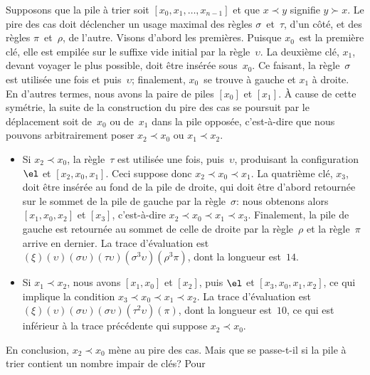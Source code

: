 Supposons que la pile à trier soit \([x_0, x_1, \dots, x_{n-1}]\) et
que \(x \prec y\) signifie \(y \succ x\). Le pire des cas doit
déclencher un usage maximal des règles \(\sigma\)~et~\(\tau\), d'un
côté, et des règles \(\pi\)~et~\(\rho\), de l'autre. Visons d'abord
les premières. Puisque \(x_0\)~est la première clé, elle est empilée
sur le suffixe vide initial par la règle~\(\upsilon\). La deuxième
clé, \(x_1\), devant voyager le plus possible, doit être insérée
sous~\(x_0\). Ce faisant, la règle~\(\sigma\) est utilisée une fois et
puis~\(\upsilon\); finalement, \(x_0\)~se trouve à gauche et \(x_1\) à
droite. En d'autres termes, nous avons la paire de piles \([x_0]\) et
\([x_1]\). À cause de cette symétrie, la suite de la construction du
pire des cas se poursuit par le déplacement soit de~\(x_0\) ou
de~\(x_1\) dans la pile opposée, c'est-à-dire que nous pouvons
arbitrairement poser \(x_2 \prec x_0\) ou \(x_1 \prec x_2\).
\begin{itemize}

\item Si \(x_2 \prec x_0\), la règle~\(\tau\) est utilisée une fois,
  puis~\(\upsilon\), produisant la configuration \(\el\) et \([x_2,
  x_0, x_1]\). Ceci suppose donc \(x_2 \prec x_0 \prec x_1\). La
  quatrième clé, \(x_3\), doit être insérée au fond de la pile de
  droite, qui doit être d'abord retournée sur le sommet de la pile de
  gauche par la règle~\(\sigma\): nous obtenons alors \([x_1, x_0,
  x_2]\) et \([x_3]\), c'est-à-dire \(x_2 \prec x_0 \prec x_1 \prec
  x_3\). Finalement, la pile de gauche est retournée au sommet de
  celle de droite par la règle~\(\rho\) et la règle~\(\pi\) arrive en
  dernier. La trace d'évaluation est
  \((\xi)(\upsilon)(\sigma\upsilon)(\tau\upsilon)(\sigma^3\upsilon)
  (\rho^3\pi)\), dont la longueur est~\(14\).

\item Si \(x_1 \prec x_2\), nous avons \([x_1, x_0]\) et \([x_2]\),
  puis \(\el\) et \([x_3, x_0, x_1, x_2]\), ce qui implique la
  condition \(x_3 \prec x_0 \prec x_1 \prec x_2\). La trace
  d'évaluation est
  \((\xi)(\upsilon)(\sigma\upsilon)(\sigma\upsilon)(\tau^2\upsilon)
  (\pi)\), dont la longueur est~\(10\), ce qui est inférieur à la
  trace précédente qui suppose \(x_2 \prec x_0\).

\end{itemize}
En conclusion, \(x_2 \prec x_0\) mène au pire des cas. Mais que se
passe-t-il si la pile à trier contient un nombre impair de clés?  Pour
